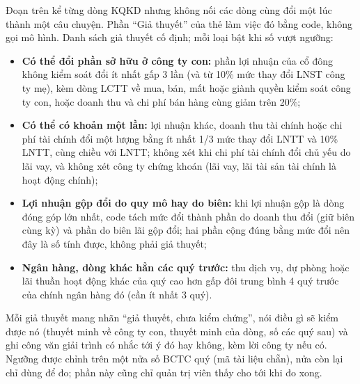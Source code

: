 \documentclass[12pt,a4paper]{report}
\newcommand{\enquote}[1]{“#1”}
\begin{document}
Đoạn trên kể từng dòng KQKD nhưng không nối các dòng cùng đổi một lúc thành một câu chuyện. Phần \enquote{Giả thuyết}
của thẻ làm việc đó bằng code, không gọi mô hình. Danh sách giả thuyết cố định; mỗi loại bật khi số vượt ngưỡng:
\begin{itemize}
  \item \textbf{Có thể đổi phần sở hữu ở công ty con:} phần lợi nhuận của cổ đông không kiểm soát đổi ít nhất gấp 3 lần
        (và từ 10\% mức thay đổi LNST công ty mẹ), kèm dòng LCTT về mua, bán, mất hoặc giành quyền kiểm soát công ty con,
        hoặc doanh thu và chi phí bán hàng cùng giảm trên 20\%;
  \item \textbf{Có thể có khoản một lần:} lợi nhuận khác, doanh thu tài chính hoặc chi phí tài chính đổi một lượng bằng
        ít nhất 1/3 mức thay đổi LNTT và 10\% LNTT, cùng chiều với LNTT; không xét khi chi phí tài chính đổi chủ yếu do lãi
        vay, và không xét công ty chứng khoán (lãi vay, lãi tài sản tài chính là hoạt động chính);
  \item \textbf{Lợi nhuận gộp đổi do quy mô hay do biên:} khi lợi nhuận gộp là dòng đóng góp lớn nhất, code tách mức đổi
        thành phần do doanh thu đổi (giữ biên cùng kỳ) và phần do biên lãi gộp đổi; hai phần cộng đúng bằng mức đổi nên
        đây là số tính được, không phải giả thuyết;
  \item \textbf{Ngân hàng, dòng khác hẳn các quý trước:} thu dịch vụ, dự phòng hoặc lãi thuần hoạt động khác của quý cao
        hơn gấp đôi trung bình 4 quý trước của chính ngân hàng đó (cần ít nhất 3 quý).
\end{itemize}
Mỗi giả thuyết mang nhãn \enquote{giả thuyết, chưa kiểm chứng}, nói điều gì sẽ kiểm được nó (thuyết minh về công ty
con, thuyết minh của dòng, số các quý sau) và ghi công văn giải trình có nhắc tới ý đó hay không, kèm lời công ty nếu
có. Ngưỡng được chỉnh trên một nửa số BCTC quý (mã tài liệu chẵn), nửa còn lại chỉ dùng để đo; phần này cũng chỉ quản
trị viên thấy cho tới khi đo xong.
\end{document}
